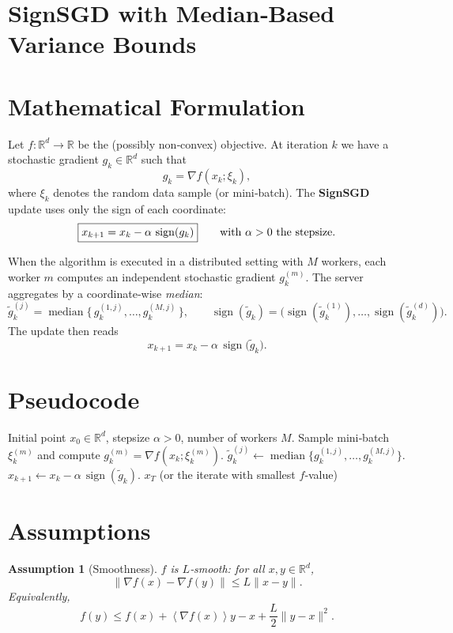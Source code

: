 \documentclass{article}
\newtheorem{assumption}{Assumption}
\newcommand{\R}{\mathbb{R}}
\newcommand{\sign}{\operatorname{sign}}
\newcommand{\inner}[1]{\left\langle#1\right\rangle}
\begin{document}
\section*{SignSGD with Median‑Based Variance Bounds}

\section*{Mathematical Formulation}
Let $f:\R^{d}\rightarrow\R$ be the (possibly non‑convex) objective.  
At iteration $k$ we have a stochastic gradient $g_k\in\R^{d}$ such that  
\[
g_k=\nabla f(x_k;\xi_k),
\]
where $\xi_k$ denotes the random data sample (or mini‑batch).  
The \textbf{SignSGD} update uses only the sign of each coordinate:
\[
\boxed{%
x_{k+1}=x_k-\alpha\,\sign(g_k)
}
\qquad\text{with }\alpha>0\text{ the stepsize.}
\]

When the algorithm is executed in a distributed setting with $M$ workers,
each worker $m$ computes an independent stochastic gradient $g_k^{(m)}$.
The server aggregates by a coordinate‑wise \emph{median}:
\[
\tilde{g}_k^{(j)}=\operatorname{median}\!\bigl\{\,g_k^{(1,j)},\dots,g_k^{(M,j)}\,\bigr\},
\qquad 
\sign(\tilde{g}_k) =\bigl(\sign(\tilde{g}_k^{(1)}),\dots,\sign(\tilde{g}_k^{(d)})\bigr) .
\]
The update then reads
\[
x_{k+1}=x_k-\alpha\,\sign\!\bigl(\tilde{g}_k\bigr).
\]

\section*{Pseudocode}
\begin{algorithm}[H]
\caption{SignSGD with Median Aggregation}
\begin{algorithmic}[1]
\REQUIRE Initial point $x_0\in\R^{d}$, stepsize $\alpha>0$, number of workers $M$.
        \STATE Sample mini‑batch $\xi_k^{(m)}$ and compute $g_k^{(m)}=\nabla f(x_k;\xi_k^{(m)})$.
    \ENDFOR
        \STATE $\tilde{g}_k^{(j)}\gets \operatorname{median}\{g_k^{(1,j)},\dots,g_k^{(M,j)}\}$.
    \ENDFOR
    \STATE $x_{k+1}\gets x_k-\alpha\,\sign(\tilde{g}_k)$.
\ENDFOR
\RETURN $x_T$ (or the iterate with smallest $f$‑value)
\end{algorithmic}
\end{algorithm}

\section*{Assumptions}
\begin{assumption}[Smoothness]\label{ass:smooth}
$f$ is $L$‑smooth: for all $x,y\in\R^{d}$,
\[
\|\nabla f(x)-\nabla f(y)\|\le L\|x-y\|.
\]
Equivalently,
\[
f(y)\le f(x)+\inner{\nabla f(x)}{y-x}+\frac{L}{2}\|y-x\|^{2}.
\]
\end{assumption}
\end{document}
